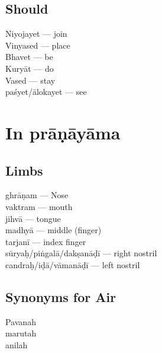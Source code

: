\subsection*{Should}
\vspace{-10pt}

\begin{multicols}{2}
Niyojayet --- join\\
Vinyased --- place\\
Bhavet --- be\\
Kuryāt --- do \\
Vased --- stay \\
paśyet/ālokayet --- see 
\end{multicols}
\vspace{-10pt}

\section*{In  prāṇāyāma}
\vspace{-5pt}

\subsection*{Limbs}
\vspace{-10pt}

\begin{multicols}{2}
ghrāṇam --- Nose\\
vaktram --- mouth\\
jihvā --- tongue\\
madhyā --- middle (finger)\\
tarjanī --- index finger\\
sūryaḥ/piṅgalā/dakṣanāḍī --- right nostril\\
candraḥ/iḍā/vāmanāḍī --- left nostril
\end{multicols}
\vspace{-10pt}

\subsection*{Synonyms for Air}
\vspace{-10pt}

\begin{multicols}{2}
Pavanah\\
marutah\\
anilah
\end{multicols}
\vspace{-10pt}

